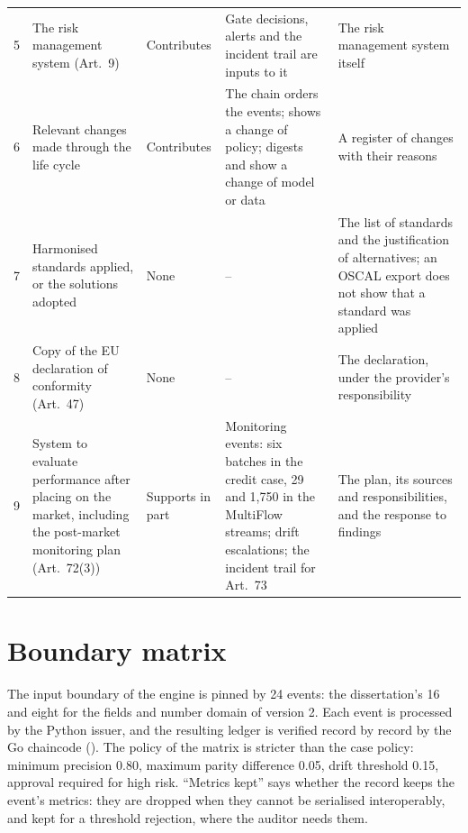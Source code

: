 \documentclass[a4paper,10pt]{article}
\begin{document}
\begin{small}
\begin{longtable}{@{}lP{3.2cm}P{1.7cm}P{4.9cm}P{4.2cm}@{}}
5 & The risk management system (Art.~9) & Contributes & Gate decisions, alerts and the incident trail are inputs to it & The risk management system itself \\
6 & Relevant changes made through the life cycle & Contributes & The chain orders the events;  shows a change of policy; digests and  show a change of model or data & A register of changes with their reasons \\
7 & Harmonised standards applied, or the solutions adopted & None & -- & The list of standards and the justification of alternatives; an OSCAL export does not show that a standard was applied \\
8 & Copy of the EU declaration of conformity (Art.~47) & None & -- & The declaration, under the provider's responsibility \\
9 & System to evaluate performance after placing on the market, including the post-market monitoring plan (Art.~72(3)) & Supports in part & Monitoring events: six batches in the credit case, 29 and 1,750 in the MultiFlow streams; drift escalations; the incident trail for Art.~73 & The plan, its sources and responsibilities, and the response to findings \\
\bottomrule
\end{longtable}
\end{small}

\section{Boundary matrix}
\label{sec:s4}

The input boundary of the engine is pinned by 24 events: the dissertation's 16 and eight for the fields and number domain of version 2. Each event is processed by the Python issuer, and the resulting ledger is verified record by record by the Go chaincode (). The policy of the matrix is stricter than the case policy: minimum precision 0.80, maximum parity difference 0.05, drift threshold 0.15, approval required for high risk. ``Metrics kept'' says whether the record keeps the event's metrics: they are dropped when they cannot be serialised interoperably, and kept for a threshold rejection, where the auditor needs them.
\end{document}
